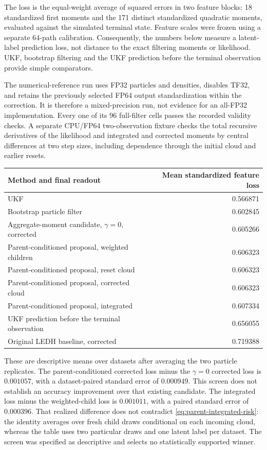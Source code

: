 The loss is the equal-weight average of squared errors in two feature blocks:
18 standardized first moments and the 171 distinct standardized quadratic
moments, evaluated against the simulated terminal state. Feature scales were
frozen using a separate 64-path calibration. Consequently, the numbers below
measure a latent-label prediction loss, not distance to the exact filtering
moments or likelihood. UKF, bootstrap filtering and the UKF prediction before
the terminal observation provide simple comparators.

The numerical-reference run uses FP32 particles and densities, disables TF32,
and retains the previously selected FP64 output standardization within the
correction. It is therefore a mixed-precision run, not evidence for an
all-FP32 implementation. Every one of its 96 full-filter cells passes the
recorded validity checks. A separate CPU/FP64 two-observation fixture checks
the total recursive derivatives of the likelihood and integrated and corrected
moments by central differences at two step sizes, including dependence through
the initial cloud and earlier resets.

\begin{center}
\begin{tabular}{lr}
\hline
Method and final readout & Mean standardized feature loss\\
\hline
UKF & 0.566871\\
Bootstrap particle filter & 0.602845\\
Aggregate-moment candidate, $\gamma=0$, corrected & 0.605266\\
Parent-conditioned proposal, weighted children & 0.606323\\
Parent-conditioned proposal, reset cloud & 0.606323\\
Parent-conditioned proposal, corrected cloud & 0.606323\\
Parent-conditioned proposal, integrated & 0.607334\\
UKF prediction before the terminal observation & 0.656055\\
Original LEDH baseline, corrected & 0.719388\\
\hline
\end{tabular}
\end{center}

These are descriptive means over datasets after averaging the two particle
replicates. The parent-conditioned corrected loss minus the $\gamma=0$
corrected loss is $0.001057$, with a dataset-paired standard error of
$0.000949$. This screen does not establish an accuracy improvement over that
existing candidate. The integrated loss minus the weighted-child loss is
$0.001011$, with a paired standard error of $0.000396$. That realized
difference does not contradict \eqref{eq:parent-integrated-risk}: the identity
averages over fresh child draws conditional on each incoming cloud, whereas
the table uses two particular draws and one latent label per dataset.
The screen was specified as descriptive and selects no statistically
supported winner.

